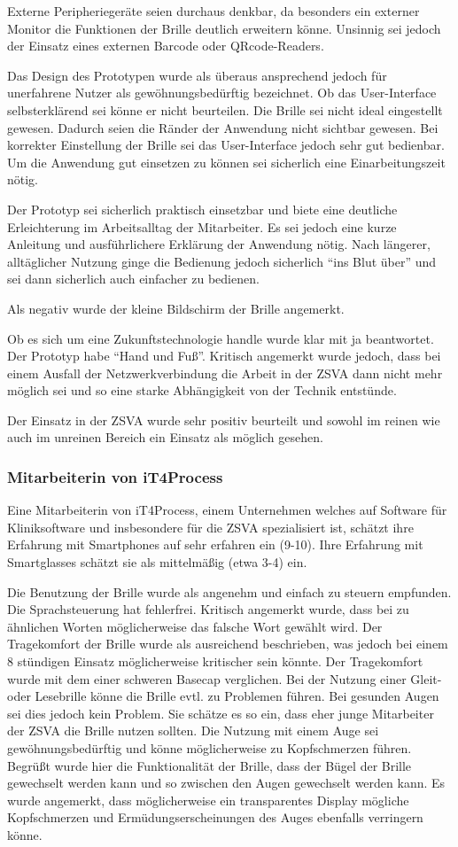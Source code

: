 Externe Peripheriegeräte seien durchaus denkbar, da besonders ein externer Monitor die Funktionen der Brille deutlich erweitern könne. Unsinnig sei jedoch der Einsatz eines externen Barcode oder QRcode-Readers.

Das Design des Prototypen wurde als überaus ansprechend jedoch für unerfahrene Nutzer als gewöhnungsbedürftig bezeichnet. Ob das User-Interface selbsterklärend sei könne er nicht beurteilen. Die Brille sei nicht ideal eingestellt gewesen. Dadurch seien die Ränder der Anwendung nicht sichtbar gewesen. Bei korrekter Einstellung der Brille sei das User-Interface jedoch sehr gut bedienbar. Um die Anwendung gut einsetzen zu können sei sicherlich eine Einarbeitungszeit nötig. 

Der Prototyp sei sicherlich praktisch einsetzbar und biete eine deutliche Erleichterung im Arbeitsalltag der Mitarbeiter. Es sei jedoch eine kurze Anleitung und ausführlichere Erklärung der Anwendung nötig. Nach längerer, alltäglicher Nutzung ginge die Bedienung jedoch sicherlich \enquote{ins Blut über} und sei dann sicherlich auch einfacher zu bedienen. 

Als negativ wurde der kleine Bildschirm der Brille angemerkt. 

Ob es sich um eine Zukunftstechnologie handle wurde klar mit ja beantwortet. Der Prototyp habe \enquote{Hand und Fuß}. Kritisch angemerkt wurde jedoch, dass bei einem Ausfall der Netzwerkverbindung die Arbeit in der ZSVA dann nicht mehr möglich sei und so eine starke Abhängigkeit von der Technik entstünde.

Der Einsatz in der ZSVA wurde sehr positiv beurteilt und sowohl im reinen wie auch im unreinen Bereich ein Einsatz als möglich gesehen.
%
\subsubsection{Mitarbeiterin von iT4Process}
%
Eine Mitarbeiterin von iT4Process, einem Unternehmen welches auf Software für Kliniksoftware und insbesondere für die ZSVA spezialisiert ist, schätzt ihre Erfahrung mit Smartphones auf sehr erfahren ein (9-10). Ihre Erfahrung mit Smartglasses schätzt sie als mittelmäßig (etwa 3-4) ein. 

Die Benutzung der Brille wurde als angenehm und einfach zu steuern empfunden. Die Sprachsteuerung hat fehlerfrei. Kritisch angemerkt wurde, dass bei zu ähnlichen Worten möglicherweise das falsche Wort gewählt wird. Der Tragekomfort der Brille wurde als ausreichend beschrieben, was jedoch bei einem 8 stündigen Einsatz möglicherweise kritischer sein könnte. Der Tragekomfort wurde mit dem einer schweren Basecap verglichen. Bei der Nutzung einer Gleit- oder Lesebrille könne die Brille evtl. zu Problemen führen. Bei gesunden Augen sei dies jedoch kein Problem. Sie schätze es so ein, dass eher junge Mitarbeiter der ZSVA die Brille nutzen sollten. Die Nutzung mit einem Auge sei gewöhnungsbedürftig und könne möglicherweise zu Kopfschmerzen führen. Begrüßt wurde hier die Funktionalität der Brille, dass der Bügel der Brille gewechselt werden kann und so zwischen den Augen gewechselt werden kann. Es wurde angemerkt, dass möglicherweise ein transparentes Display mögliche Kopfschmerzen und Ermüdungserscheinungen des Auges ebenfalls verringern könne.

